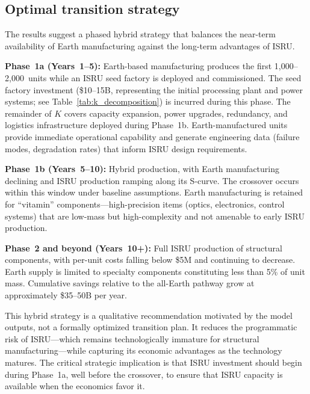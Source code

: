 \documentclass[preprint,12pt]{elsarticle}
\begin{document}
\subsection{Optimal transition strategy}

The results suggest a phased hybrid strategy that balances the near-term availability of Earth manufacturing against the long-term advantages of ISRU.

\textbf{Phase~1a (Years~1--5):} Earth-based manufacturing produces the first 1{,}000--2{,}000~units while an ISRU seed factory is deployed and commissioned. The seed factory investment (\$10--15B, representing the initial processing plant and power systems; see Table~\ref{tab:k_decomposition}) is incurred during this phase. The remainder of $K$ covers capacity expansion, power upgrades, redundancy, and logistics infrastructure deployed during Phase~1b. Earth-manufactured units provide immediate operational capability and generate engineering data (failure modes, degradation rates) that inform ISRU design requirements.

\textbf{Phase~1b (Years~5--10):} Hybrid production, with Earth manufacturing declining and ISRU production ramping along its S-curve. The crossover occurs within this window under baseline assumptions. Earth manufacturing is retained for ``vitamin'' components---high-precision items (optics, electronics, control systems) that are low-mass but high-complexity and not amenable to early ISRU production.

\textbf{Phase~2 and beyond (Years~10+):} Full ISRU production of structural components, with per-unit costs falling below \$5M and continuing to decrease. Earth supply is limited to specialty components constituting less than 5\% of unit mass. Cumulative savings relative to the all-Earth pathway grow at approximately \$35--50B per year.

This hybrid strategy is a qualitative recommendation motivated by the model outputs, not a formally optimized transition plan. It reduces the programmatic risk of ISRU---which remains technologically immature for structural manufacturing---while capturing its economic advantages as the technology matures. The critical strategic implication is that ISRU investment should begin during Phase~1a, well before the crossover, to ensure that ISRU capacity is available when the economics favor it.
\end{document}
